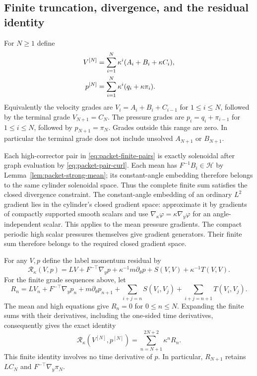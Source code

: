 \documentclass[11pt]{article}
\theoremstyle{definition}
\begin{document}
\subsection{Finite truncation, divergence, and the residual identity}
For $N\ge1$ define
\begin{align}
 V^{[N]}&=\sum_{i=1}^N\kappa^i(A_i+B_i+\kappa C_i),\notag\\
 p^{[N]}&=\sum_{i=1}^N\kappa^i(q_i+\kappa\pi_i).
                                                        \label{eq:packet-finite-pairs}
\end{align}
Equivalently the velocity grades are $V_i=A_i+B_i+C_{i-1}$ for
$1\le i\le N$, followed by the terminal grade $V_{N+1}=C_N$.
The pressure grades are $p_i=q_i+\pi_{i-1}$ for $1\le i\le N$,
followed by $p_{N+1}=\pi_N$. Grades outside this range are zero.
In particular the terminal grade does not include unsolved
$A_{N+1}$ or $B_{N+1}$.

Each high-corrector pair in \eqref{eq:packet-finite-pairs} is exactly
solenoidal after graph evaluation by \eqref{eq:packet-pair-curl}.
Each mean has $F^{-1}B_i\in\mathcal H$ by
Lemma~\ref{lem:packet-strong-mean}; its constant-angle embedding therefore
belongs to the same cylinder solenoidal space. Thus the complete finite
sum satisfies the closed divergence constraint. The constant-angle
embedding of an ordinary $L^2$ gradient lies in the cylinder's closed
gradient space: approximate it by gradients of compactly supported
smooth scalars and use $\nabla_\kappa\varphi=\kappa\nabla_y\varphi$
for an angle-independent scalar. This applies to the mean pressure
gradients. The compact periodic high scalar pressures themselves give
gradient generators. Their finite sum therefore belongs to the required
closed gradient space.

For any $V,p$ define the label momentum residual by
\begin{equation}\label{eq:packet-raw-residual}
 \mathcal R_\kappa(V,p)=LV+F^{-\top}\nabla_yp+
 \kappa^{-1}m\partial_\theta p+S(V,V)+\kappa^{-1}T(V,V).
\end{equation}
For the finite grade sequences above, let
\[
 R_n=LV_n+F^{-\top}\nabla_yp_n+m\partial_\theta p_{n+1}
       +\sum_{i+j=n}S(V_i,V_j)+\sum_{i+j=n+1}T(V_i,V_j).
\]
The mean and high equations give $R_n=0$ for $0\le n\le N$.
Expanding the finite sums with their derivatives, including the
one-sided time derivatives, consequently gives the exact identity
\begin{equation}\label{eq:packet-tail-identity}
 \mathcal R_\kappa(V^{[N]},p^{[N]})
   =\sum_{n=N+1}^{2N+2}\kappa^nR_n.
\end{equation}
This finite identity involves no time derivative of $p$.
In particular, $R_{N+1}$ retains $LC_N$ and
$F^{-\top}\nabla_y\pi_N$.
\end{document}
